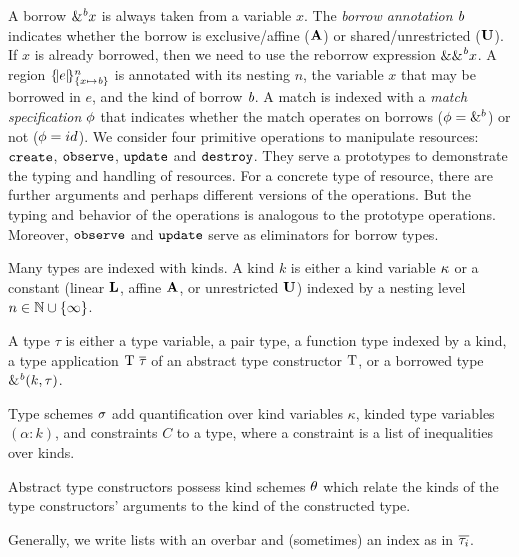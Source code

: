 A borrow $\borrow{x}$ is always taken from a variable $x$. The
\emph{borrow annotation} $\BORROW$ indicates whether the borrow is exclusive/affine
($\MBORROW$) or shared/unrestricted ($\IBORROW$). If $x$ is already borrowed,
then we need to use the reborrow expression $\reborrow{x}$.
%
A region $\region{\Sone x\BORROW}{e}$ is annotated with its nesting $n$, the variable $x$ that may be borrowed in $e$, and the kind of borrow $\BORROW$.
%
A match is indexed with a \emph{match specification} $\etransfm$ that indicates
whether the match operates on borrows ($\etransfm=\&^b$) or not ($\etransfm=id$).
%
We consider four primitive operations to manipulate resources:
$\create$, $\observe$, $\update$ and $\destroy$.
They serve a prototypes to demonstrate the typing and handling of
resources. For a concrete type of resource, there are further
arguments and perhaps different versions of the operations. But the
typing and behavior of the operations is analogous to the prototype
operations. Moreover, $\observe$ and $\update$ serve as eliminators
for borrow types.

Many types are indexed with kinds.
A kind $k$ is either a kind variable $\kvar$ or a constant
(linear $\klin$, affine $\kaff$, or unrestricted $\kun$) indexed
by a nesting level $n \in \Nat \cup \{\infty\}$.

A type $\tau$ is either a type variable, a pair type, a function type indexed by a
kind,
a type application $\tapp{\tcon}{\Multi{\tau}}$ of an abstract type constructor
$\T T$, or a borrowed type  $\borrowty{k}{\tau}$.

Type schemes $\schm$ add quantification over kind
variables $\kappa$, kinded type variables $(\alpha:k)$, and constraints
$C$ to a type, where a constraint is a list of inequalities over
kinds.

Abstract type constructors possess kind schemes $\kschm$ which relate
the kinds of the type constructors' arguments to the kind of the
constructed type.

Generally, we write lists with an overbar and (sometimes) an index as
in $\Multi[i]\tau$.




